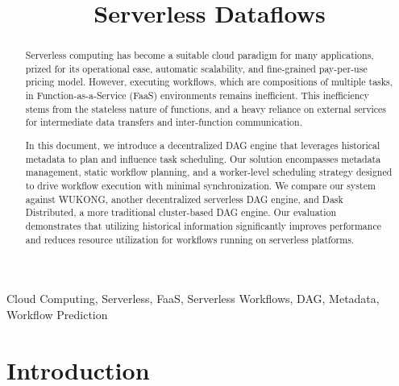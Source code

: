 \documentclass[conference]{IEEEtran}
\begin{document}
\title{Serverless Dataflows}

\author{
}
\maketitle

\begin{abstract}
Serverless computing has become a suitable cloud paradigm for many applications, prized for its operational ease, automatic scalability, and fine-grained pay-per-use pricing model. However, executing workflows, which are compositions of multiple tasks, in Function-as-a-Service (FaaS) environments remains inefficient. This inefficiency stems from the stateless nature of functions, and a heavy reliance on external services for intermediate data transfers and inter-function communication.

In this document, we introduce a decentralized DAG engine that leverages historical metadata to plan and influence task scheduling. Our solution encompasses metadata management, static workflow planning, and a worker-level scheduling strategy designed to drive workflow execution with minimal synchronization. We compare our system against WUKONG, another decentralized serverless DAG engine, and Dask Distributed, a more traditional cluster-based DAG engine. Our evaluation demonstrates that utilizing historical information significantly improves performance and reduces resource utilization for workflows running on serverless platforms.
\end{abstract}

\begin{IEEEkeywords}
Cloud Computing, Serverless, FaaS, Serverless Workflows, DAG, Metadata, Workflow Prediction
\end{IEEEkeywords}

\section{Introduction}
\label{s:introduction}
\end{document}
